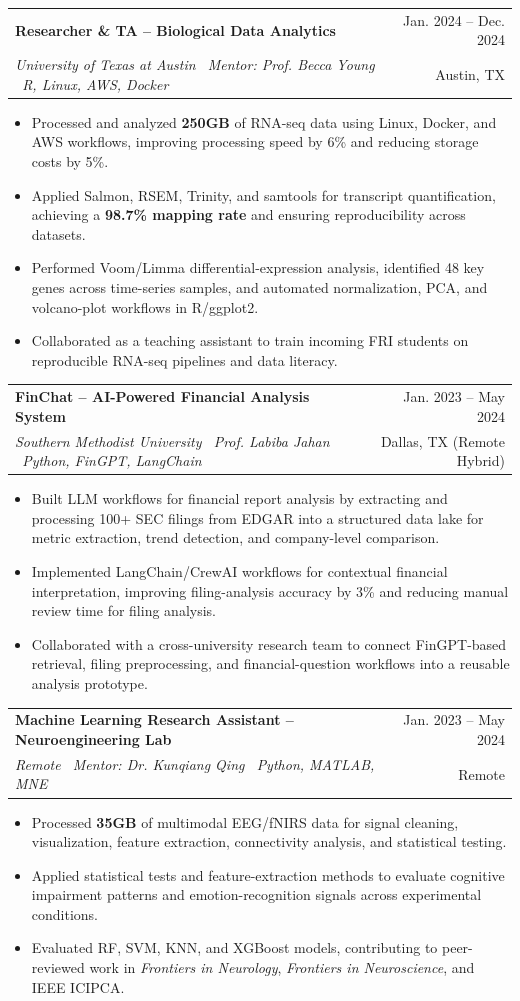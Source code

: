 \documentclass[letterpaper,10pt]{article}
\makeatletter
\newcommand{\resumeItem}[1]{\item\footnotesize{#1\vspace{-2pt}}}
\newcommand{\resumeSubheading}[4]{
  \vspace{-2pt}\item
    \begin{tabular*}{0.985\textwidth}[t]{l@{\extracolsep{\fill}}r}
      \textbf{#1} & \small #2 \\
      \textit{\small #3} & \small #4 \\
    \end{tabular*}\vspace{-4pt}
}
\newcommand{\resumeItemListStart}{\begin{itemize}[leftmargin=0.17in,itemsep=1.5pt,topsep=2pt,label={$\bullet$}]}
\newcommand{\resumeItemListEnd}{\end{itemize}\vspace{0pt}}
\makeatother
\begin{document}
\resumeSubheading{Researcher \& TA -- Biological Data Analytics}{Jan. 2024 -- Dec. 2024}{University of Texas at Austin \textbar\ Mentor: Prof. Becca Young \textbar\ R, Linux, AWS, Docker}{Austin, TX}
\resumeItemListStart
\resumeItem{Processed and analyzed \textbf{250GB} of RNA-seq data using Linux, Docker, and AWS workflows, improving processing speed by 6\% and reducing storage costs by 5\%.}
\resumeItem{Applied Salmon, RSEM, Trinity, and samtools for transcript quantification, achieving a \textbf{98.7\% mapping rate} and ensuring reproducibility across datasets.}
\resumeItem{Performed Voom/Limma differential-expression analysis, identified 48 key genes across time-series samples, and automated normalization, PCA, and volcano-plot workflows in R/ggplot2.}
\resumeItem{Collaborated as a teaching assistant to train incoming FRI students on reproducible RNA-seq pipelines and data literacy.}
\resumeItemListEnd

\resumeSubheading{FinChat -- AI-Powered Financial Analysis System}{Jan. 2023 -- May 2024}{Southern Methodist University \textbar\ Prof. Labiba Jahan \textbar\ Python, FinGPT, LangChain}{Dallas, TX (Remote Hybrid)}
\resumeItemListStart
\resumeItem{Built LLM workflows for financial report analysis by extracting and processing 100+ SEC filings from EDGAR into a structured data lake for metric extraction, trend detection, and company-level comparison.}
\resumeItem{Implemented LangChain/CrewAI workflows for contextual financial interpretation, improving filing-analysis accuracy by 3\% and reducing manual review time for filing analysis.}
\resumeItem{Collaborated with a cross-university research team to connect FinGPT-based retrieval, filing preprocessing, and financial-question workflows into a reusable analysis prototype.}
\resumeItemListEnd

\resumeSubheading{Machine Learning Research Assistant -- Neuroengineering Lab}{Jan. 2023 -- May 2024}{Remote \textbar\ Mentor: Dr. Kunqiang Qing \textbar\ Python, MATLAB, MNE}{Remote}
\resumeItemListStart
\resumeItem{Processed \textbf{35GB} of multimodal EEG/fNIRS data for signal cleaning, visualization, feature extraction, connectivity analysis, and statistical testing.}
\resumeItem{Applied statistical tests and feature-extraction methods to evaluate cognitive impairment patterns and emotion-recognition signals across experimental conditions.}
\resumeItem{Evaluated RF, SVM, KNN, and XGBoost models, contributing to peer-reviewed work in \textit{Frontiers in Neurology}, \textit{Frontiers in Neuroscience}, and IEEE ICIPCA.}
\resumeItemListEnd
\end{document}
